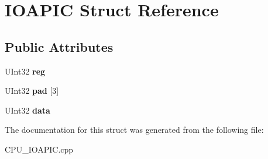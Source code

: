 \hypertarget{struct_i_o_a_p_i_c}{}\section{I\+O\+A\+P\+IC Struct Reference}
\label{struct_i_o_a_p_i_c}
\subsection*{Public Attributes}
\begin{DoxyCompactItemize}
\item 
\mbox{\label{struct_i_o_a_p_i_c_aafdf3c2083f371ccd5814c5d3bacce9b}} 
U\+Int32 {\bfseries reg}
\item 
\mbox{\label{struct_i_o_a_p_i_c_a8bf1974ec2873ff8f940523ca1a5ff5a}} 
U\+Int32 {\bfseries pad} \mbox{[}3\mbox{]}
\item 
\mbox{\label{struct_i_o_a_p_i_c_ad1fae589f25cbee722fae2f4f93b7d6a}} 
U\+Int32 {\bfseries data}
\end{DoxyCompactItemize}


The documentation for this struct was generated from the following file\+:\begin{DoxyCompactItemize}
\item 
C\+P\+U\+\_\+\+I\+O\+A\+P\+I\+C.\+cpp\end{DoxyCompactItemize}
